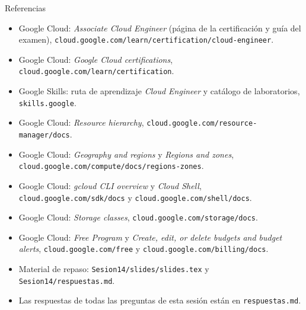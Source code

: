 \documentclass[aspectratio=169,10pt,c]{beamer}
\begin{document}
\begin{frame}{Referencias}
\scriptsize
\begin{itemize}\setlength\itemsep{3pt}
  \item Google Cloud: \emph{Associate Cloud Engineer} (página de la certificación y guía del examen), \texttt{cloud.google.com/learn/certification/cloud-engineer}.
  \item Google Cloud: \emph{Google Cloud certifications}, \texttt{cloud.google.com/learn/certification}.
  \item Google Skills: ruta de aprendizaje \emph{Cloud Engineer} y catálogo de laboratorios, \texttt{skills.google}.
  \item Google Cloud: \emph{Resource hierarchy}, \texttt{cloud.google.com/resource-manager/docs}.
  \item Google Cloud: \emph{Geography and regions} y \emph{Regions and zones}, \texttt{cloud.google.com/compute/docs/regions-zones}.
  \item Google Cloud: \emph{gcloud CLI overview} y \emph{Cloud Shell}, \texttt{cloud.google.com/sdk/docs} y \texttt{cloud.google.com/shell/docs}.
  \item Google Cloud: \emph{Storage classes}, \texttt{cloud.google.com/storage/docs}.
  \item Google Cloud: \emph{Free Program} y \emph{Create, edit, or delete budgets and budget alerts}, \texttt{cloud.google.com/free} y \texttt{cloud.google.com/billing/docs}.
  \item Material de repaso: \texttt{Sesion14/slides/slides.tex} y \texttt{Sesion14/respuestas.md}.
  \item Las respuestas de todas las preguntas de esta sesión están en \texttt{respuestas.md}.
\end{itemize}
\end{frame}
\end{document}
